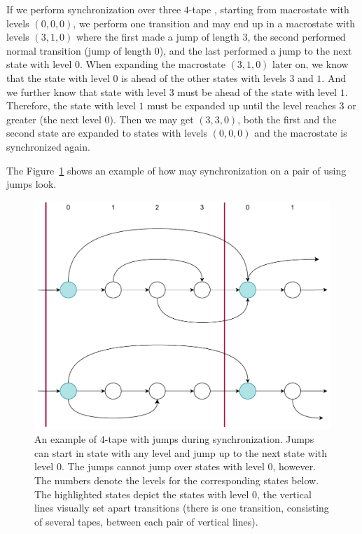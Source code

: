 \begin{example}
  If we perform synchronization over three $4$-tape \nfts, starting from macrostate with levels $(0, 0, 0)$, we perform one transition and may end up in a macrostate with levels $(3, 1, 0)$ where the first \nft made a jump of length $3$, the second performed normal transition (jump of length $0$), and the last \nft performed a jump to the next state with level $0$.
  When expanding the macrostate $(3, 1, 0)$ later on, we know that the state with level $0$ is ahead of the other states with levels $3$ and $1$. And we further know that state with level $3$ must be ahead of the state with level $1$. Therefore, the state with level $1$ must be expanded up until the level reaches $3$ or greater (the next level $0$).
  Then we may get $(3, 3, 0)$, both the first and the second state are expanded to states with levels $(0, 0, 0)$ and the macrostate is synchronized again.

  The Figure~\ref{fig:synchronization_jumps} shows an example of how may synchronization on a pair of \nfts using jumps look.
\end{example}

\begin{figure}[ht]
  \centering
  \includegraphics[scale=0.5, keepaspectratio]{obrazky-figures/jumps_synchronization.drawio.pdf}
  \caption{
    An example of $4$-tape \nfts with jumps during synchronization.
    Jumps can start in state with any level and jump up to the next state with level $0$.
    The jumps cannot jump over states with level $0$, however.
    The numbers denote the levels for the corresponding states below.
    The highlighted states depict the states with level $0$, the vertical lines visually set apart \nft transitions (there is one \nft transition, consisting of several tapes, between each pair of vertical lines).
  }
  \label{fig:synchronization_jumps}

\end{figure}


